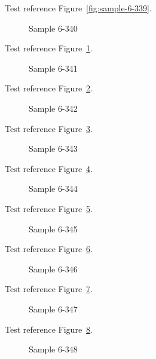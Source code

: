 Test reference Figure~\ref{fig:sample-6-339}.

\begin{figure}[tbhp]
\caption{Sample 6-340}
\label{fig:sample-6-340}
\end{figure}

Test reference Figure~\ref{fig:sample-6-340}.

\begin{figure}[tbhp]
\caption{Sample 6-341}
\label{fig:sample-6-341}
\end{figure}

Test reference Figure~\ref{fig:sample-6-341}.

\begin{figure}[tbhp]
\caption{Sample 6-342}
\label{fig:sample-6-342}
\end{figure}

Test reference Figure~\ref{fig:sample-6-342}.

\begin{figure}[tbhp]
\caption{Sample 6-343}
\label{fig:sample-6-343}
\end{figure}

Test reference Figure~\ref{fig:sample-6-343}.

\begin{figure}[tbhp]
\caption{Sample 6-344}
\label{fig:sample-6-344}
\end{figure}

Test reference Figure~\ref{fig:sample-6-344}.

\begin{figure}[tbhp]
\caption{Sample 6-345}
\label{fig:sample-6-345}
\end{figure}

Test reference Figure~\ref{fig:sample-6-345}.

\begin{figure}[tbhp]
\caption{Sample 6-346}
\label{fig:sample-6-346}
\end{figure}

Test reference Figure~\ref{fig:sample-6-346}.

\begin{figure}[tbhp]
\caption{Sample 6-347}
\label{fig:sample-6-347}
\end{figure}

Test reference Figure~\ref{fig:sample-6-347}.

\begin{figure}[tbhp]
\caption{Sample 6-348}
\label{fig:sample-6-348}
\end{figure}

